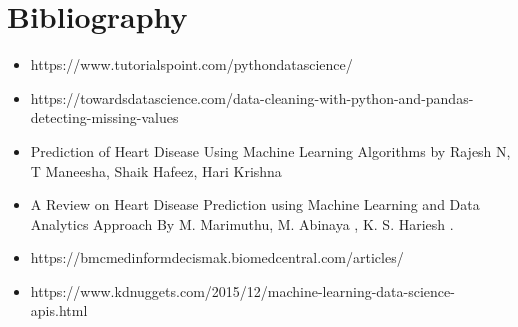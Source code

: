 \documentclass[oneside,12pt]{Classes/VTU}
\begin{document}
	\chapter*{Bibliography}
	\begin{itemize}
		\item https://www.tutorialspoint.com/pythondatascience/   
		\item  https://towardsdatascience.com/data-cleaning-with-python-and-pandas-detecting-missing-values
		\item Prediction of Heart Disease Using Machine Learning Algorithms  by Rajesh N, T Maneesha, Shaik Hafeez, Hari Krishna 
		\item  A Review on Heart Disease Prediction using Machine Learning and Data Analytics Approach By M. Marimuthu, M. Abinaya , K. S. Hariesh .
		\item https://bmcmedinformdecismak.biomedcentral.com/articles/ 
		\item https://www.kdnuggets.com/2015/12/machine-learning-data-science-apis.html
	\end{itemize}
\end{document}
